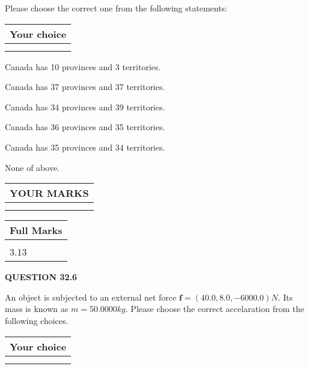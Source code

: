 \documentclass[12pt]{article}
\begin{document}
  
Please choose the correct one from the following statements:
  
  
\noindent\hspace{3.0in} \begin{tabular}{|l|}
\hline
Your choice \\
\hline
 \\ 
 \\ 
\hline
\end{tabular}
  
  
 
 
Canada has  %
10 provinces and  %
3 territories.
 
 
Canada has  %
37 provinces and  %
37 territories.
 
 
Canada has  %
34 provinces and  %
39 territories.
 
 
Canada has  %
36 provinces and  %
35 territories.
 
 
Canada has  %
35 provinces and  %
34 territories.
 
 
 None of above.
 
 
  
\vspace{0.2in}
  
\noindent\begin{tabular}{|l|}
\hline
 YOUR MARKS  \\
\hline
 \\ 
 \\ 
\hline
\end{tabular}
\hspace{0.05in} \begin{tabular}{|l|}
\hline
 Full Marks  \\
\hline
 \\ 
3.13 \\
\hline
\end{tabular}
{\textbf{\Large{QUESTION
32.6 
}}}
  
  
 
 
An object is subjected to an external net force $\mathbf{f}=
(40.0 , 8.0 , -6000.0) N$.
Its mass is known as $m= %
50.0000 kg$. Please choose the
correct accelaration from the following choices.
 
  
  
\noindent\hspace{3.0in} \begin{tabular}{|l|}
\hline
Your choice \\
\hline
 \\ 
 \\ 
\hline
\end{tabular}
  
\end{document}
